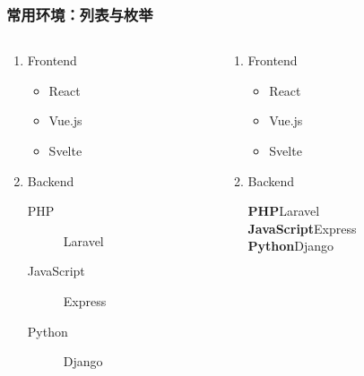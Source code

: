 \begin{frame}[fragile]
\frametitle{常用环境：列表与枚举}
\begin{columns}
\begin{column}{0.54\textwidth}
  \begin{texcode}[gobble=4, emph={[1]enumerate,itemize}]
    \begin{enumerate}
      \item Frontend
        \begin{itemize}
          \item React
          \item Vue.js
          \item Svelte
        \end{itemize}
      \item Backend
        \begin{description}
          \item[PHP] Laravel
          \item[JavaScript] Express
          \item[Python] Django
        \end{description}
    \end{enumerate}
  \end{texcode}
\end{column}
\pause
\begin{column}{0.38\textwidth}
  \begin{enumerate}
    \item Frontend
      \begin{itemize}
        \item React
        \item Vue.js
        \item Svelte
      \end{itemize}
    \item Backend \par
        \vspace{0.5ex}\small
        \textbf{PHP}\enspace Laravel \\
        \textbf{JavaScript}\enspace Express \\
        \textbf{Python}\enspace Django
  \end{enumerate}
\end{column}
\end{columns}
\end{frame}

